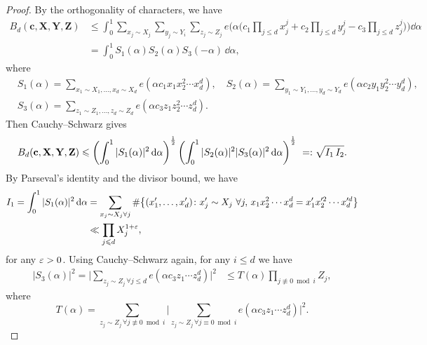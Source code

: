 \begin{proof}
By the orthogonality of characters, we have
\begin{align*}
B_d(\mathbf{c},\mathbf{X},\mathbf{Y},\mathbf{Z}) &\leq \int_0^1 \sum_{x_j\sim X_j}\sum_{y_j\sim Y_i}\sum_{z_j\sim Z_j}e\Big(\alpha\Big(c_1\prod_{j\leq d}x_j^j+c_2\prod_{j\leq d}y_j^j-c_3\prod_{j\leq d}z_j^j\Big)\Big)\dd{\alpha} \nonumber\\
&= \int_{0}^1 S_1(\alpha)S_2(\alpha)S_3(-\alpha)\, \dd \alpha,
\end{align*}
where
\begin{align*}
&S_1(\alpha)=\sum_{x_1\sim X_1,\ldots, x_d\sim X_d}e(\alpha c_1x_1x_2^2\cdots x_d^d),\quad  S_2(\alpha)=\sum_{y_1\sim Y_1,\ldots, y_d\sim Y_d}e(\alpha c_2y_1y_2^2\cdots y_d^d),\\
&S_3(\alpha)=\sum_{z_1\sim Z_1,\ldots, z_d\sim Z_d}e(\alpha c_3z_1z_2^2\cdots z_d^d).
\end{align*}
Then Cauchy--Schwarz gives
\begin{align}\label{eq:Bc123}
B_d(\mathbf{c},\mathbf{X},\mathbf{Y},\mathbf{Z})  \leqslant \left(\int_{0}^1|S_1(\alpha)|^2\, \textnormal{d}\alpha\right)^{\frac{1}{2}}\left(\int_{0}^1|S_2(\alpha)|^2|S_3(\alpha)|^2\, \textnormal{d}\alpha\right)^{\frac{1}{2}} \ =: \sqrt{I_1\,I_2}.
\end{align}
By Parseval's identity and the divisor bound, we have
\begin{align}\label{eq:prop3.1I1}\begin{split}
I_1 =\int_{0}^1|S_1(\alpha)|^2\, \textnormal{d}\alpha
&= \sum_{x_j\sim X_j\forall j}\#\big\{(x_1',\ldots, x_d')\colon x_j'\sim X_j\,\, \forall j,\, x_1x_2^2\cdots x_d^d=x_1'x_2'^2\cdots x_d'^d \big\}\\
& \ll  \prod_{j\leqslant d} X_j^{1+\varepsilon},
\end{split}
\end{align}
for any $\varepsilon>0$.
Using Cauchy--Schwarz again, for any $i\le d$ we have
\begin{align*}
|S_3(\alpha)|^2  = \bigg|\sum_{z_j\sim Z_j\,\forall j\leq d}e(\alpha c_3z_1\cdots z_d^d)\bigg|^2
&\leq T(\alpha)\prod_{j\not \equiv 0\bmod i}Z_{j},
\end{align*}
where
$$
T(\alpha)=
\sum_{z_j\sim Z_j\, \forall j\not \equiv 0\bmod i}\bigg|\sum_{z_j\sim Z_j\, \forall j\equiv 0\bmod i}e(\alpha c_3z_1\cdots z_d^d)\bigg|^2.
$$


\end{proof}
